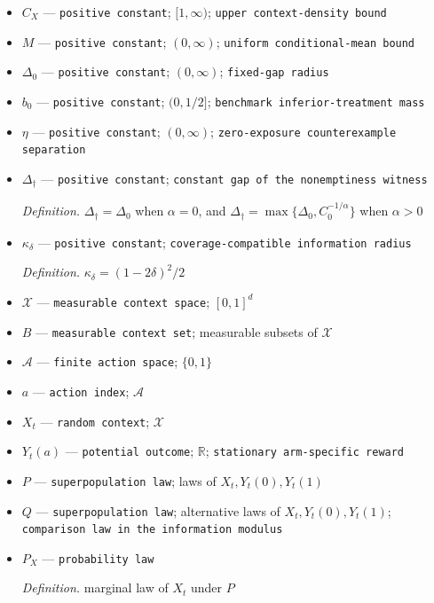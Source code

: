 \documentclass{article}
\begin{document}
\begin{itemize}
  \item \(C_X\) --- \texttt{positive constant}; \([1,\infty)\); \texttt{upper context-\allowbreak{}density bound}
  \item \(M\) --- \texttt{positive constant}; \((0,\infty)\); \texttt{uniform conditional-\allowbreak{}mean bound}
  \item \(\Delta_0\) --- \texttt{positive constant}; \((0,\infty)\); \texttt{fixed-\allowbreak{}gap radius}
  \item \(b_0\) --- \texttt{positive constant}; \((0,1/2]\); \texttt{benchmark inferior-\allowbreak{}treatment mass}
  \item \(\eta\) --- \texttt{positive constant}; \((0,\infty)\); \texttt{zero-\allowbreak{}exposure counterexample separation}
  \item \(\Delta_\dagger\) --- \texttt{positive constant}; \texttt{constant gap of the nonemptiness witness}
  \par\smallskip\noindent\emph{Definition.} \(\Delta_\dagger=\Delta_0\) when \(\alpha=0\), and \(\Delta_\dagger=\max\{\Delta_0,C_0^{-1/\alpha}\}\) when \(\alpha>0\)
  \item \(\kappa_\delta\) --- \texttt{positive constant}; \texttt{coverage-\allowbreak{}compatible information radius}
  \par\smallskip\noindent\emph{Definition.} \(\kappa_\delta=(1-2\delta)^2/2\)
  \item \(\mathcal X\) --- \texttt{measurable context space}; \([0,1]^d\)
  \item \(B\) --- \texttt{measurable context set}; measurable subsets of \(\mathcal X\)
  \item \(\mathcal A\) --- \texttt{finite action space}; \(\{0,1\}\)
  \item \(a\) --- \texttt{action index}; \(\mathcal A\)
  \item \(X_t\) --- \texttt{random context}; \(\mathcal X\)
  \item \(Y_t(a)\) --- \texttt{potential outcome}; \(\mathbb R\); \texttt{stationary arm-\allowbreak{}specific reward}
  \item \(P\) --- \texttt{superpopulation law}; laws of \(X_t,Y_t(0),Y_t(1)\)
  \item \(Q\) --- \texttt{superpopulation law}; alternative laws of \(X_t,Y_t(0),Y_t(1)\); \texttt{comparison law in the information modulus}
  \item \(P_X\) --- \texttt{probability law}
  \par\smallskip\noindent\emph{Definition.} marginal law of \(X_t\) under \(P\)

\end{itemize}
\end{document}
